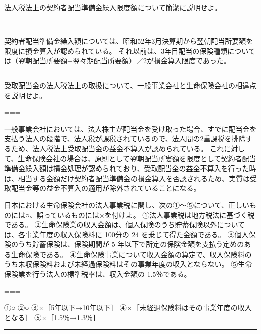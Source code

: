 \documentclass[report,gutter=10mm,fore-edge=10mm,uplatex,dvipdfmx]{jlreq}
\begin{document}

法人税法上の契約者配当準備金繰入限度額について簡潔に説明せよ。

===


契約者配当準備金繰入額については、昭和52年3月決算期から翌朝配当所要額を限度に損金算入が認められている。
それ以前は、3年目配当の保険種類については（翌朝配当所要額+翌々期配当所要額）／2が損金算入限度であった。

\begin{center}\rule{0.5\linewidth}{0.5pt}\end{center}


受取配当金の法人税法上の取扱について、一般事業会社と生命保険会社の相違点を説明せよ。

===


一般事業会社においては、法人株主が配当金を受け取った場合、すでに配当金を支払う法人の段階で、法人税が課税されているので、法人間の2重課税を排除するため、法人税法上受取配当金の益金不算入が認められている。
これに対して、生命保険会社の場合は、原則として翌朝配当所婁額を限度として契約者配当準備金繰入額は損金処理が認められており、受取配当金の益金不算入を行った時は、相当する金額だけ契約者配当準備金の損金算入を否認されるため、実質は受取配当金等の益金不算入の適用が除外されていることになる。


日本における生命保険会社の法人事業税に関し、次の①～⑤について、正しいものには○、誤っているものには×を付けよ。
①法人事業税は地方税法に基づく税である。
②生命保険業の収入金額は、個人保険のうち貯蓄保険以外については、各事業年度の収入保険料に
100分の 24 を乗じて得た金額である。
③個人保険のうち貯蓄保険は、保険期間が 5
年以下で所定の保険金額を支払う定めのある生命保険である。
④生命保険事業について収入金額の算定で、収入保険料のうち未収保険料および未経過保険料はその事業年度の収入とならない。
⑤生命保険業を行う法人の標準税率は、収入金額の 1.5％である。

===


①○ ②○ ③×［5年以下→10年以下］
④×［未経過保険料はその事業年度の収入となる］ ⑤×［1.5％→1.3％］

\begin{center}\rule{0.5\linewidth}{0.5pt}\end{center}
\end{document}
